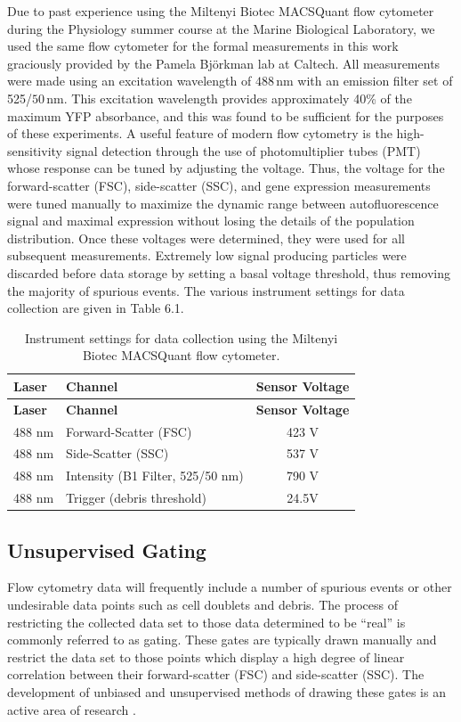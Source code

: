 \documentclass[12pt]{caltech_thesis}
\begin{document}
Due to past experience using the Miltenyi Biotec MACSQuant flow
cytometer during the Physiology summer course at the Marine Biological
Laboratory, we used the same flow cytometer for the formal measurements
in this work graciously provided by the Pamela Björkman lab at Caltech.
All measurements were made using an excitation wavelength of
\(488\,\text{nm}\) with an emission filter set of 525/\(50\,\text{nm}\).
This excitation wavelength provides approximately 40\% of the maximum
YFP absorbance, and this was found to be sufficient for the purposes of
these experiments. A useful feature of modern flow cytometry is the
high-sensitivity signal detection through the use of photomultiplier
tubes (PMT) whose response can be tuned by adjusting the voltage. Thus,
the voltage for the forward-scatter (FSC), side-scatter (SSC), and gene
expression measurements were tuned manually to maximize the dynamic
range between autofluorescence signal and maximal expression without
losing the details of the population distribution. Once these voltages
were determined, they were used for all subsequent measurements.
Extremely low signal producing particles were discarded before data
storage by setting a basal voltage threshold, thus removing the majority
of spurious events. The various instrument settings for data collection
are given in Table 6.1.

\begin{longtable}[]{@{}llc@{}}
\caption{Instrument settings for data collection using the Miltenyi
Biotec MACSQuant flow cytometer.}\tabularnewline
\toprule()
\textbf{Laser} & \textbf{Channel} & \textbf{Sensor Voltage} \\
\midrule()
\endfirsthead
\toprule()
\textbf{Laser} & \textbf{Channel} & \textbf{Sensor Voltage} \\
\midrule()
\endhead
488 nm & Forward-Scatter (FSC) & 423 V \\
488 nm & Side-Scatter (SSC) & 537 V \\
488 nm & Intensity (B1 Filter, 525/50 nm) & 790 V \\
488 nm & Trigger (debris threshold) & 24.5V \\
\bottomrule()
\end{longtable}

\hypertarget{unsupervised-gating}{%
\subsection{Unsupervised Gating}\label{unsupervised-gating}}

Flow cytometry data will frequently include a number of spurious events
or other undesirable data points such as cell doublets and debris. The
process of restricting the collected data set to those data determined
to be ``real'' is commonly referred to as gating. These gates are
typically drawn manually and restrict the data set to those points which
display a high degree of linear correlation between their
forward-scatter (FSC) and side-scatter (SSC). The development of
unbiased and unsupervised methods of drawing these gates is an active
area of research \autocite{aghaeepour2013}.
\end{document}
